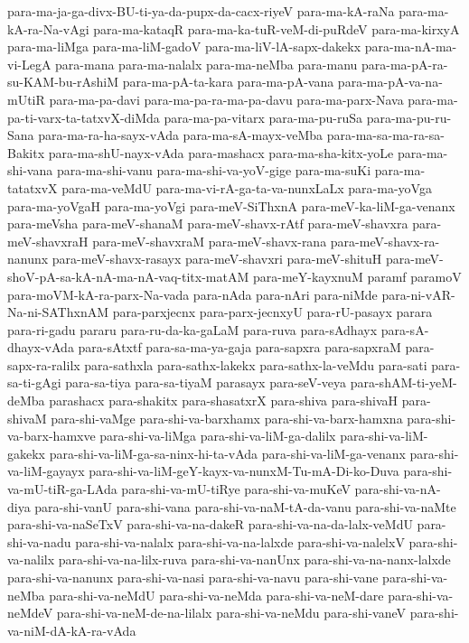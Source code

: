 {para-ma-ja-ga-divx-BU-ti-ya-da-pupx-da-cacx-riyeV
para-ma-kA-raNa
para-ma-kA-ra-Na-vAgi
para-ma-kataqR
para-ma-ka-tuR-veM-di-puRdeV
para-ma-kirxyA
para-ma-liMga
para-ma-liM-gadoV
para-ma-liV-lA-sapx-dakekx
para-ma-nA-ma-vi-LegA
para-mana
para-ma-nalalx
para-ma-neMba
para-manu
para-ma-pA-ra-su-KAM-bu-rAshiM
para-ma-pA-ta-kara
para-ma-pA-vana
para-ma-pA-va-na-mUtiR
para-ma-pa-davi
para-ma-pa-ra-ma-pa-davu
para-ma-parx-Nava
para-ma-pa-ti-varx-ta-tatxvX-diMda
para-ma-pa-vitarx
para-ma-pu-ruSa
para-ma-pu-ru-Sana
para-ma-ra-ha-sayx-vAda
para-ma-sA-mayx-veMba
para-ma-sa-ma-ra-sa-Bakitx
para-ma-shU-nayx-vAda
para-mashacx
para-ma-sha-kitx-yoLe
para-ma-shi-vana
para-ma-shi-vanu
para-ma-shi-va-yoV-gige
para-ma-suKi
para-ma-tatatxvX
para-ma-veMdU
para-ma-vi-rA-ga-ta-va-nunxLaLx
para-ma-yoVga
para-ma-yoVgaH
para-ma-yoVgi
para-meV-SiThxnA
para-meV-ka-liM-ga-venanx
para-meVsha
para-meV-shanaM
para-meV-shavx-rAtf
para-meV-shavxra
para-meV-shavxraH
para-meV-shavxraM
para-meV-shavx-rana
para-meV-shavx-ra-nanunx
para-meV-shavx-rasayx
para-meV-shavxri
para-meV-shituH
para-meV-shoV-pA-sa-kA-nA-ma-nA-vaq-titx-matAM
para-meY-kayxnuM
paramf
paramoV
para-moVM-kA-ra-parx-Na-vada
para-nAda
para-nAri
para-niMde
para-ni-vAR-Na-ni-SAThxnAM
para-parxjecnx
para-parx-jecnxyU
para-rU-pasayx
parara
para-ri-gadu
pararu
para-ru-da-ka-gaLaM
para-ruva
para-sAdhayx
para-sA-dhayx-vAda
para-sAtxtf
para-sa-ma-ya-gaja
para-sapxra
para-sapxraM
para-sapx-ra-ralilx
para-sathxla
para-sathx-lakekx
para-sathx-la-veMdu
para-sati
para-sa-ti-gAgi
para-sa-tiya
para-sa-tiyaM
parasayx
para-seV-veya
para-shAM-ti-yeM-deMba
parashacx
para-shakitx
para-shasatxrX
para-shiva
para-shivaH
para-shivaM
para-shi-vaMge
para-shi-va-barxhamx
para-shi-va-barx-hamxna
para-shi-va-barx-hamxve
para-shi-va-liMga
para-shi-va-liM-ga-dalilx
para-shi-va-liM-gakekx
para-shi-va-liM-ga-sa-ninx-hi-ta-vAda
para-shi-va-liM-ga-venanx
para-shi-va-liM-gayayx
para-shi-va-liM-geY-kayx-va-nunxM-Tu-mA-Di-ko-Duva
para-shi-va-mU-tiR-ga-LAda
para-shi-va-mU-tiRye
para-shi-va-muKeV
para-shi-va-nA-diya
para-shi-vanU
para-shi-vana
para-shi-va-naM-tA-da-vanu
para-shi-va-naMte
para-shi-va-naSeTxV
para-shi-va-na-dakeR
para-shi-va-na-da-lalx-veMdU
para-shi-va-nadu
para-shi-va-nalalx
para-shi-va-na-lalxde
para-shi-va-nalelxV
para-shi-va-nalilx
para-shi-va-na-lilx-ruva
para-shi-va-nanUnx
para-shi-va-na-nanx-lalxde
para-shi-va-nanunx
para-shi-va-nasi
para-shi-va-navu
para-shi-vane
para-shi-va-neMba
para-shi-va-neMdU
para-shi-va-neMda
para-shi-va-neM-dare
para-shi-va-neMdeV
para-shi-va-neM-de-na-lilalx
para-shi-va-neMdu
para-shi-vaneV
para-shi-va-niM-dA-kA-ra-vAda
}
